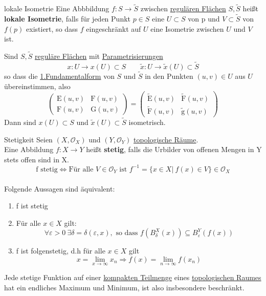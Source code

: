 \begin{titleDef}{lokale Isometrie}
\label{lokIso}
Eine Abbbildung $f:S\to\tilde{S}$ zwischen \hyperref[regFlaeche]{regulären Flächen} $S,\tilde{S}$ heißt \textbf{lokale Isometrie}, falls für jeden Punkt $p\in S$ eine \offUm $U\subset S$ von p und $V\subset\tilde{S}$ von $f(p)$ existiert, so dass $f$ eingeschränkt auf $U$ eine Isometrie zwischen $U$ und $V$ ist.\par
Sind $S,\tilde{S}$ \hyperref[regFlaeche]{reguläre Flächen} mit \hyperref[parametrisierung]{Parametrisierungen}
$$x:U\to x(U)\subset S\qquad \tilde{x}:U\to \tilde{x}(U)\subset\tilde{S}$$
so dass die \hyperref[fundamentalformEins]{1.Fundamentalform} von $S$ und $\tilde{S}$ in den Punkten $(u,v)\in U$ aus $U$ übereinstimmen, also
$$
	\begin{pmatrix} 
	\mathrm{E}(u,v) & \mathrm{F}(u,v)\\
	\mathrm{F}(u,v) & \mathrm{G}(u,v)
\end{pmatrix} = 
	\begin{pmatrix} 
	\mathrm{\tilde{E}}(u,v) & \mathrm{\tilde{F}}(u,v)\\
	\mathrm{\tilde{F}}(u,v) & \mathrm{\tilde{g}}(u,v)
\end{pmatrix} 
$$
Dann sind $x(U)\subset S$ und $\tilde{x}(U)\subset\tilde{S}$ isometrisch.
\end{titleDef}

\begin{titleDef}{Stetigkeit}
\label{stetig}
Seien $(X,\mathcal{O}_X)$ und $(Y,\mathcal{O}_Y)$ \hyperref[Topologie]{topologische Räume}.\\
Eine Abbildung $f:X\to Y$ heißt \textbf{stetig}, falls die Urbilder von offenen Mengen in Y stets offen sind in X.
$$\text{f stetig} \Leftrightarrow \text{Für alle } V\in\mathcal{O}_Y \text{ ist } f^{-1}=\{x\in X|\ f(x)\in V\}\in\mathcal{O}_X$$\\
Folgende Aussagen sind äquivalent:
\renewcommand{\labelenumi}{(\roman{enumi})}
\begin{enumerate}
    \item f ist stetig
    \item Für alle $x\in X$ gilt:
    $$\forall\varepsilon>0\ \exists \delta=\delta(\varepsilon,x), \text{ so dass } f(B_\delta^X(x))\subseteq B_\varepsilon^Y(f(x))$$
    \item f ist folgenstetig, d.h für alle $x\in X$ gilt
    $$x=\lim_{x\to\infty}x_n \Rightarrow f(x)=\lim_{n\to\infty}f(x_n)$$
\end{enumerate}
Jede stetige Funktion auf einer \hyperref[kompakt]{kompakten Teilmenge} eines \hyperref[Topologie]{topologischen Raumes} hat ein endliches Maximum und Minimum, ist also insbesondere beschränkt.
\end{titleDef}

